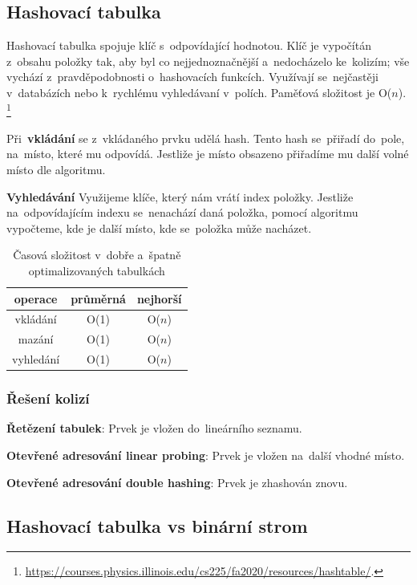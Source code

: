 \subsection{Hashovací tabulka}

Hashovací tabulka spojuje klíč s~odpovídající hodnotou. Klíč je vypočítán z~obsahu položky tak, aby byl co nejjednoznačnější a~nedocházelo ke~kolizím; vše vychází z~pravděpodobnosti o~hashovacích funkcích. Využívají se~nejčastěji v~databázích nebo k~rychlému vyhledávaní v~polích. Paměťová složitost je O(\( n \)).%
\footnote{\url{https://courses.physics.illinois.edu/cs225/fa2020/resources/hashtable/}.}

Při~\textbf{vkládání} se z~vkládaného prvku udělá hash. Tento hash se~přiřadí do~pole, na~místo, které mu odpovídá. Jestliže je místo obsazeno přiřadíme mu další volné místo dle algoritmu.

\textbf{Vyhledávání} Využijeme klíče, který nám vrátí index položky. Jestliže na~odpovídajícím indexu se~nenachází daná položka, pomocí algoritmu vypočteme, kde je další místo, kde se~položka může nacházet.

\begin{table}[ht]
	\centering
	\caption{Časová složitost v~dobře a~špatně optimalizovaných tabulkách}
	\begin{tabular}{|c||c|c|}\hline
		operace   & průměrná & nejhorší   \\\hline\hline
		vkládání  & O(1)     & O(\( n \)) \\\hline
		mazání    & O(1)     & O(\( n \)) \\\hline
		vyhledání & O(1)     & O(\( n \)) \\\hline
	\end{tabular}
\end{table}

\subsubsection{Řešení kolizí}

\textbf{Řetězení tabulek}: Prvek je vložen do~lineárního seznamu.

\textbf{Otevřené adresování linear probing}: Prvek je vložen na~další vhodné místo.

\textbf{Otevřené adresování double hashing}: Prvek je zhashován znovu.

\subsection{Hashovací tabulka vs binární strom}

